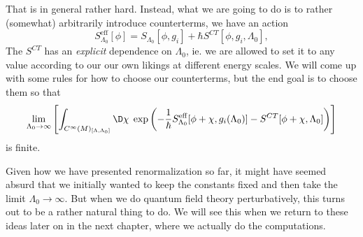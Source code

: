\documentclass[a4paper]{article}
\begin{document}
That is in general rather hard. Instead, what we are going to do is to rather (somewhat) arbitrarily introduce counterterms, we have an action
\[
  S_{\Lambda_0}^{\mathrm{eff}} [\phi] = S_{\Lambda_0}[\phi, g_i] + \hbar S^{CT}[\phi, g_i, \Lambda_0],
\]
The $S^{CT}$ has an \emph{explicit} dependence on $\Lambda_0$, ie. we are allowed to set it to any value according to our our own likings at different energy scales. We will come up with some rules for how to choose our counterterms, but the end goal is to choose them so that
%
\[
  \lim_{\Lambda_0 \to \infty}\left[ \int_{C^\infty(M)_{[\Lambda, \Lambda_0]}} \D \chi \; \exp\left(- \frac{1}{\hbar}S_{\Lambda_0}^{\mathrm{eff}}[\phi + \chi, g_i(\Lambda_0)] - S^{CT}[\phi + \chi, \Lambda_0]\right)\right] %
\]
is finite.

Given how we have presented renormalization so far, it might have seemed absurd that we initially wanted to keep the constants fixed and then take the limit $\Lambda_0 \to \infty$. But when we do quantum field theory perturbatively, this turns out to be a rather natural thing to do. We will see this when we return to these ideas later on in the next chapter, where we actually do the computations.
\end{document}
